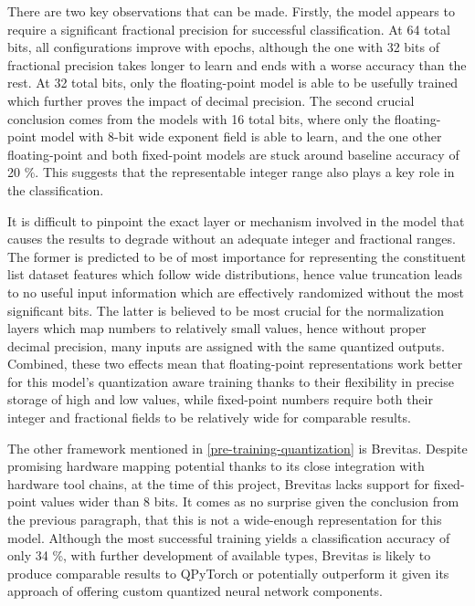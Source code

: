 There are two key observations that can be made. Firstly, the model appears to require a significant fractional precision for successful classification. At 64 total bits, all configurations improve with epochs, although the one with 32 bits of fractional precision takes longer to learn and ends with a worse accuracy than the rest. At 32 total bits, only the floating-point model is able to be usefully trained which further proves the impact of decimal precision. The second crucial conclusion comes from the models with 16 total bits, where only the floating-point model with 8-bit wide exponent field is able to learn, and the one other floating-point and both fixed-point models are stuck around baseline accuracy of 20 \%. This suggests that the representable integer range also plays a key role in the classification.

It is difficult to pinpoint the exact layer or mechanism involved in the model that causes the results to degrade without an adequate integer and fractional ranges. The former is predicted to be of most importance for representing the constituent list dataset features which follow wide distributions, hence value truncation leads to no useful input information which are effectively randomized without the most significant bits. The latter is believed to be most crucial for the normalization layers which map numbers to relatively small values, hence without proper decimal precision, many inputs are assigned with the same quantized outputs. Combined, these two effects mean that floating-point representations work better for this model's quantization aware training thanks to their flexibility in precise storage of high and low values, while fixed-point numbers require both their integer and fractional fields to be relatively wide for comparable results.

The other framework mentioned in \cref{pre-training-quantization} is Brevitas. Despite promising hardware mapping potential thanks to its close integration with hardware tool chains, at the time of this project, Brevitas lacks support for fixed-point values wider than 8 bits. It comes as no surprise given the conclusion from the previous paragraph, that this is not a wide-enough representation for this model. Although the most successful training yields a classification accuracy of only 34 \%, with further development of available types, Brevitas is likely to produce comparable results to QPyTorch or potentially outperform it given its approach of offering custom quantized neural network components.

